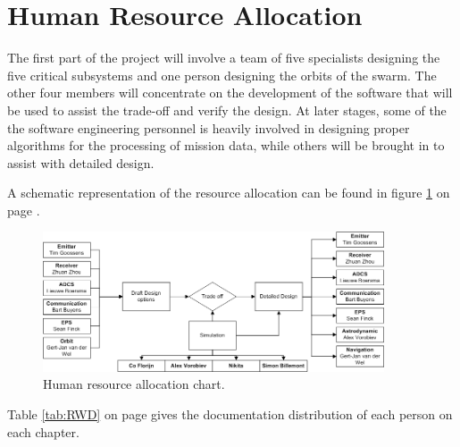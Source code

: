 \section{Human Resource Allocation}
\label{DDHR}
The first part of the project will involve a team of five specialists designing the five critical subsystems and one person designing the orbits of the swarm. The other four members will concentrate on the development of the software that will be used to assist the trade-off and verify the design. At later stages, some of the the software engineering personnel is heavily involved in designing proper algorithms for the processing of mission data, while others will be brought in to assist with detailed design. 

A schematic representation of the resource allocation can be found in figure \ref{fig:DDBBHR} on page \pageref{fig:DDBBHR}.

\begin{figure}[h!]
\begin{center}
\includegraphics[width=0.9\textwidth]{chapters/img/DDBBHR.jpg}
\end{center}
\caption{Human resource allocation chart.}
\label{fig:DDBBHR}
\end{figure}

Table \ref{tab:RWD} on page \pageref{tab:RWD} gives the documentation distribution of each person on each chapter.

